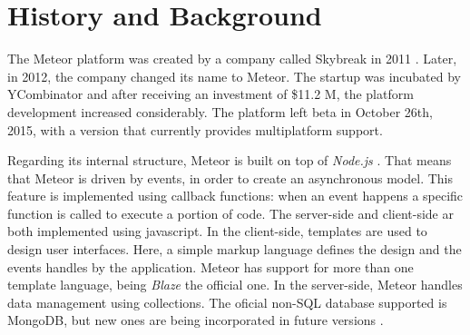 \section{History and Background}
\label{sec:back}

The Meteor platform was created by a company called Skybreak in 2011 \citep{skybreak}.
Later, in 2012, the company changed its name to Meteor.
The startup was incubated by YCombinator \citep{ycomb} and after receiving an investment of \$11.2 M, the platform development increased considerably.
The platform left beta in October 26th, 2015, with a version that currently provides multiplatform support.

Regarding its internal structure, Meteor is built on top of \emph{Node.js} \citep{node}.
That means that Meteor is driven by events, in order to create an asynchronous model.
This feature is implemented using callback functions: when an event happens a specific function is called to execute a portion of code.
The server-side and client-side ar both implemented using javascript.
In the client-side, templates are used to design user interfaces.
Here, a simple markup language defines the design and the events handles by the application.
Meteor has support for more than one template language, being \emph{Blaze} \citep{meteor} the official one.
In the server-side, Meteor handles data management using collections.
The oficial non-SQL database supported is MongoDB, but new ones are being incorporated in future versions \citep{fathom}.
